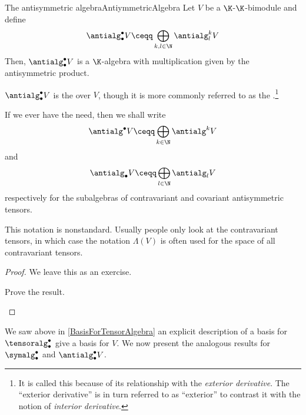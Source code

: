 \begin{thm}{The antisymmetric algebra}{AntiymmetricAlgebra}
	Let $V$ be a $\K$-$\K$-bimodule and define
	\begin{equation}
		\antialg _{\bullet}^{\bullet}V\ceqq \bigoplus _{k,l\in \N}\antialg _l^kV
	\end{equation} 
	Then, $\antialg _{\bullet}^{\bullet}V$ is a $\K$-algebra with multiplication given by the antisymmetric product.
	\begin{rmk}
		$\antialg _{\bullet}^{\bullet}V$ is the  over $V$, though it is more commonly referred to as the .\footnote{It is called this because of its relationship with the \emph{exterior derivative}.  The ``exterior derivative'' is in turn referred to as ``exterior'' to contrast it with the notion of \emph{interior derivative}.}
	\end{rmk}
	\begin{rmk}
		If we ever have the need, then we shall write
		\begin{equation}
			\antialg ^{\bullet}V\ceqq \bigoplus _{k\in \N}\antialg ^kV
		\end{equation}\index[notation]{$\antialg ^{\bullet}V$}
		and
		\begin{equation}
		\antialg _{\bullet}V\ceqq \bigoplus _{l\in \N}\antialg _lV
		\end{equation}\index[notation]{$\antialg _{\bullet}V$}
		respectively for the subalgebras of contravariant and covariant antisymmetric tensors.
	\end{rmk}
	\begin{rmk}
		This notation is nonstandard.  Usually people only look at the contravariant tensors, in which case the notation $\Lambda (V)$ is often used for the space of all contravariant tensors.
	\end{rmk}
	\begin{proof}
		We leave this as an exercise.
		\begin{exr}[breakable=false]{}{}
			Prove the result.
		\end{exr}
	\end{proof}
\end{thm}
We saw above in \cref{BasisForTensorAlgebra} an explicit description of a basis for $\tensoralg _{\bullet}^{\bullet}$ give a basis for $V$.  We now present the analogous results for $\symalg _{\bullet}^{\bullet}$ and $\antialg _{\bullet}^{\bullet}V$.
